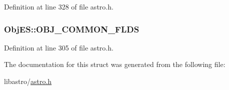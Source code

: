 Definition at line 328 of file astro.\-h.

\hypertarget{struct_obj_e_s_aa17c09f5e88fab7e6a51c49354bb02ee}{
\subsubsection[{O\-B\-J\-\_\-\-C\-O\-M\-M\-O\-N\-\_\-\-F\-L\-D\-S}]{\setlength{\rightskip}{0pt plus 5cm}Obj\-E\-S\-::\-O\-B\-J\-\_\-\-C\-O\-M\-M\-O\-N\-\_\-\-F\-L\-D\-S}}\label{struct_obj_e_s_aa17c09f5e88fab7e6a51c49354bb02ee}


Definition at line 305 of file astro.\-h.



The documentation for this struct was generated from the following file\-:\begin{DoxyCompactItemize}
\item 
libastro/\hyperlink{astro_8h}{astro.\-h}\end{DoxyCompactItemize}
